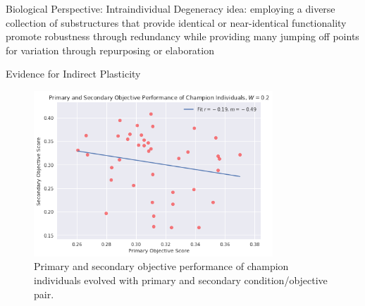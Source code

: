 \begin{frame}{Biological Perspective: Intraindividual Degeneracy}
  idea: employing a diverse collection of substructures that provide identical or near-identical functionality promote robustness through redundancy while providing many jumping off points for variation through repurposing or elaboration
  
\end{frame}


\begin{frame}{Evidence for Indirect Plasticity}
\begin{figure}
    \centering
    \includegraphics[width=0.8\textwidth]{img/primary_secondary_w02}
 	\captionsetup{singlelinecheck=off,justification=raggedright}
  	\caption{Primary and secondary objective performance of champion individuals evolved with primary and secondary condition/objective pair.}
    \label{fig:ev_w0}
\end{figure}
\end{frame}


